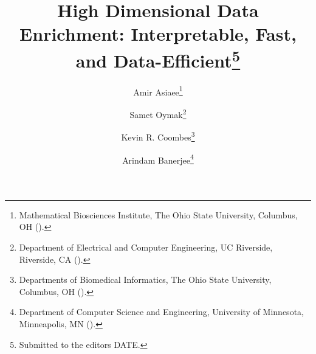 
\title{High Dimensional Data Enrichment: Interpretable, Fast, and Data-Efficient\thanks{Submitted to the editors DATE.
}}

\author{Amir Asiaee\thanks{Mathematical Biosciences Institute, The Ohio State University, Columbus, OH
  ().}
\and Samet Oymak\thanks{Department of Electrical and Computer Engineering, UC Riverside, Riverside, CA
  ().}
\and Kevin R. Coombes\thanks{Departments of Biomedical Informatics, The Ohio State University, Columbus, OH
	().}
\and Arindam Banerjee\thanks{Department of Computer Science and Engineering, University of Minnesota, Minneapolis, MN
	().}
}


\usepackage{amsopn}
\DeclareMathOperator{\diag}{diag}


